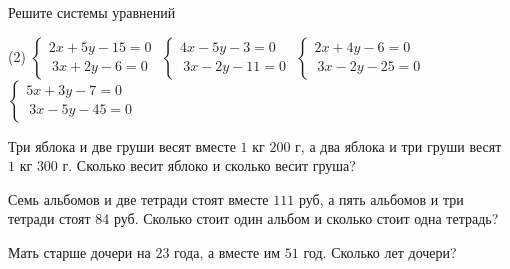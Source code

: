 \begin{homework}[number=1]
	\begin{listofex}
		\item Решите системы уравнений
		\begin{tasks}(2)
			\task \( \begin{cases}
				2x+5y-15=0 \\\
				3x+2y-6=0 
			\end{cases} \)
			\task \( \begin{cases}
				4x-5y-3=0 \\\
				3x-2y-11=0 
			\end{cases} \)
			\task \( \begin{cases}
				2x+4y-6=0 \\\
				3x-2y-25=0 
			\end{cases} \)
			\task \( \begin{cases}
				5x+3y-7=0 \\\
				3x-5y-45=0 
			\end{cases} \)
			
		\end{tasks}
		\item Три яблока и две груши весят вместе \( 1 \) кг \( 200 \) г, а два яблока и три груши весят \( 1 \) кг \( 300 \) г. Сколько весит яблоко и сколько весит груша?
		\item Семь альбомов и две тетради стоят вместе \( 111 \) руб, а пять альбомов и три тетради стоят \( 84 \) руб. Сколько стоит один альбом и сколько стоит одна тетрадь?
		\item Мать старше дочери на \( 23 \) года, а вместе им \( 51 \) год. Сколько лет дочери?
	\end{listofex}
\end{homework}

